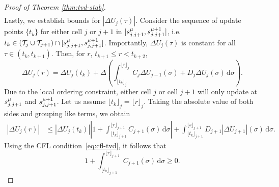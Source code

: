 \begin{proof}[Proof of Theorem \ref{thm:tvd-stab}]
\begin{multline}
\end{multline}
Lastly, we establish bounds for $|\Delta U_j(\tau)|$. Consider the sequence of update points $\{t_k\}$ for either cell $j$ or $j+1$ in $[s^{\mu}_{j,j+1},s^{\mu+1}_{j,j+1}]$, i.e. $t_k \in \left(\mathcal{T}_j \cup \mathcal{T}_{j+1}\right) \cap [s^{\mu}_{j,j+1}, s^{\mu+1}_{j,j+1}]$. Importantly, $\Delta U_j(\tau)$ is constant for all $\tau \in (t_k,t_{k+1})$. Then, for $r$, $t_{k+1} \le r < t_{k+2}$,
\begin{equation*}
\Delta U_j(r) = \Delta U_j(t_k) + \Delta \left( \int_{\lfloor t_k \rfloor_j }^{\lfloor r \rfloor_j} C_j \Delta U_{j-1}(\sigma) + D_j \Delta U_j(\sigma) \,\mathrm{d} \sigma \right).
\end{equation*}
Due to the local ordering constraint, either cell $j$ or cell $j+1$ will only update at $s^{\mu}_{j,j+1}$ and $s^{\mu+1}_{j,j+1}$. Let us assume $\lfloor t_k \rfloor_j = \lfloor r \rfloor_j$. Taking the absolute value of both sides and grouping like terms, we obtain
\begin{align*}
|\Delta U_j(r)| &\le |\Delta U_j(t_k)| \left|1 + \int_{\lfloor t_k \rfloor_{j+1} }^{\lfloor r \rfloor_{j+1}} C_{j+1}(\sigma) \,\mathrm{d} \sigma \right| + \int_{\lfloor t_k \rfloor_{j+1} }^{\lfloor s \rfloor_{j+1}} D_{j+1}|\Delta U_{j+1}|(\sigma) \,\mathrm{d} \sigma.
\end{align*}
Using the CFL condition~\eqref{eq:cfl-tvd}, it follows that
\begin{equation*}
1 + \int_{\lfloor t_k \rfloor_{j+1}}^{\lfloor r \rfloor_{j+1}} C_{j+1}(\sigma) \,\mathrm{d}\sigma \ge 0.
\end{equation*}

\end{proof}
